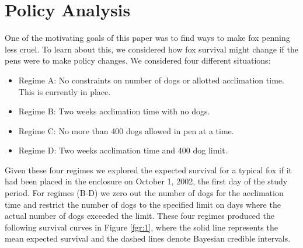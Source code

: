 \documentclass[aoas,preprint]{imsart}
\numberwithin{equation}{section}
\theoremstyle{plain}
\begin{document}
\section{Policy Analysis}
One of the motivating goals of this paper was to find ways to make fox penning less cruel. To learn about this, we considered how fox survival might change if the pens were to make policy changes. We considered four different situations:
	\begin{itemize}
		\item Regime A: No constraints on number of dogs or allotted acclimation time. This is currently in place.
		\item Regime B: Two weeks acclimation time with no dogs.
		\item Regime C: No more than 400 dogs allowed in pen at a time.
		\item Regime D: Two weeks acclimation time and 400 dog limit.
	\end{itemize}
Given these four regimes we explored the expected survival for a typical fox if it had been placed in the enclosure on October 1, 2002, the first day of the study period. For regimes (B-D) we zero out the number of dogs for the acclimation time and restrict the number of dogs to the specified limit on days where the actual number of dogs exceeded the limit.
These four regimes produced the following survival curves in Figure \ref{fgr:1}, where the solid line represents the mean expected survival and the dashed lines denote Bayesian credible intervals.
\end{document}
